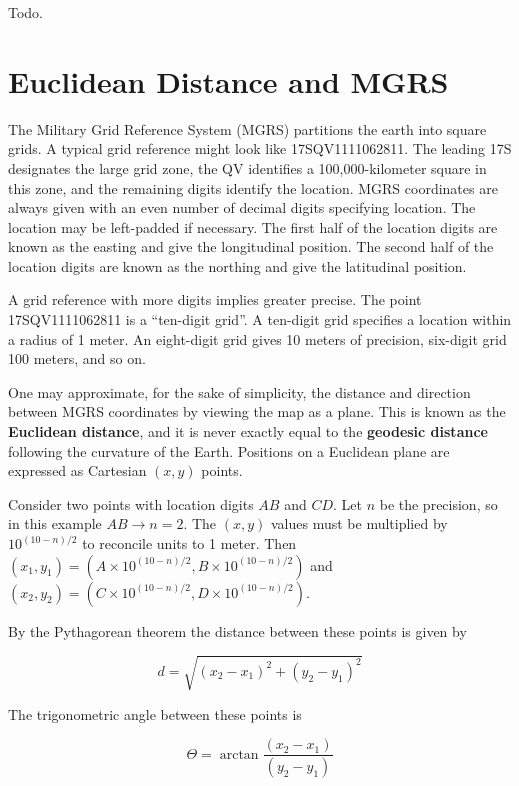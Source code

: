 \documentclass{book}
\begin{document}
Todo.

\chapter{Euclidean Distance and MGRS}

The Military Grid Reference System (MGRS) partitions the earth into square grids. A typical grid reference might look like 17SQV1111062811. The leading 17S designates the large grid zone, the QV identifies a 100,000-kilometer square in this zone, and the remaining digits identify the location. MGRS coordinates are always given with an even number of decimal digits specifying location. The location may be left-padded if necessary. The first half of the location digits are known as the easting and give the longitudinal position. The second half of the location digits are known as the northing and give the latitudinal position.

A grid reference with more digits implies greater precise. The point 17SQV1111062811 is a ``ten-digit grid''. A ten-digit grid specifies a location within a radius of 1 meter. An eight-digit grid gives 10 meters of precision, six-digit grid 100 meters, and so on.

One may approximate, for the sake of simplicity, the distance and direction between MGRS coordinates by viewing the map as a plane. This is known as the \textbf{Euclidean distance}, and it is never exactly equal to the \textbf{geodesic distance} following the curvature of the Earth. Positions on a Euclidean plane are expressed as Cartesian $(x,y)$ points.

Consider two points with location digits $AB$ and $CD$. Let $n$ be the precision, so in this example $AB \to n=2$. The $(x,y)$ values must be multiplied by $10^{{(10-n)}/2}$ to reconcile units to 1 meter. Then $(x_1,y_1) = (A \times 10^{{(10 - n)}/2}, B \times 10^{{(10 - n)}/2})$ and $(x_2,y_2) = (C \times 10^{{(10 - n)}/2}, D \times 10^{{(10 - n)}/2})$.

By the Pythagorean theorem the distance between these points is given by 

\begin{equation}
d = \sqrt{(x_2 - x_1)^2 + (y_2 - y_1)^2}
\end{equation}

The trigonometric angle between these points is

\begin{equation}
\Theta = \arctan{\frac{(x_2 - x_1)}{(y_2 - y_1)}}
\end{equation}
\end{document}
